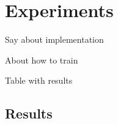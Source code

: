 \section{Experiments}
\label{sec:experiments}
Say about implementation

About how to train 

Table with results

\subsection{Results}
